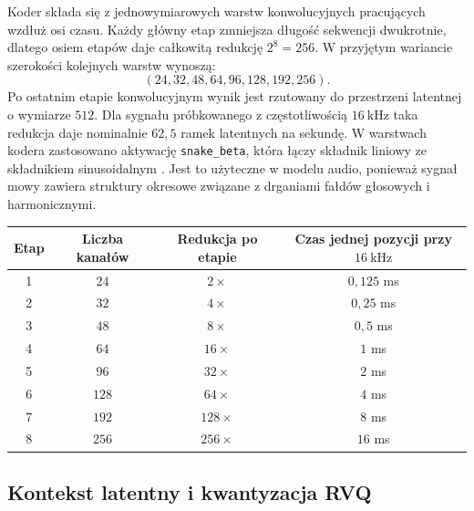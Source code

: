 Koder składa się z jednowymiarowych warstw konwolucyjnych pracujących wzdłuż osi czasu. Każdy główny etap zmniejsza długość sekwencji dwukrotnie, dlatego osiem etapów daje całkowitą redukcję \(2^8=256\). W przyjętym wariancie szerokości kolejnych warstw wynoszą:
\[
(24, 32, 48, 64, 96, 128, 192, 256).
\]
Po ostatnim etapie konwolucyjnym wynik jest rzutowany do przestrzeni latentnej o wymiarze \(512\). Dla sygnału próbkowanego z częstotliwością \(16\ \mathrm{kHz}\) taka redukcja daje nominalnie \(62{,}5\) ramek latentnych na sekundę. W warstwach kodera zastosowano aktywację \texttt{snake\_beta}, która łączy składnik liniowy ze składnikiem sinusoidalnym \cite{Ziyin2020Snake,Kumar2023ImprovedRVQGAN}. Jest to użyteczne w modelu audio, ponieważ sygnał mowy zawiera struktury okresowe związane z drganiami fałdów głosowych i harmonicznymi.

\begin{center}
\centering
\small
\begin{tabular}{c c c c}
\toprule
Etap & Liczba kanałów & Redukcja po etapie & Czas jednej pozycji przy \(16\ \mathrm{kHz}\) \\
\midrule
1 & \(24\) & \(2\times\) & \(0{,}125\) ms \\
2 & \(32\) & \(4\times\) & \(0{,}25\) ms \\
3 & \(48\) & \(8\times\) & \(0{,}5\) ms \\
4 & \(64\) & \(16\times\) & \(1\) ms \\
5 & \(96\) & \(32\times\) & \(2\) ms \\
6 & \(128\) & \(64\times\) & \(4\) ms \\
7 & \(192\) & \(128\times\) & \(8\) ms \\
8 & \(256\) & \(256\times\) & \(16\) ms \\
\bottomrule
\end{tabular}
\label{tab:koder-redukcja-referencyjny}
\end{center}

\subsection{Kontekst latentny i kwantyzacja RVQ}

